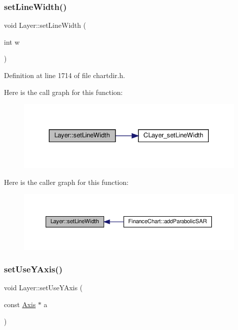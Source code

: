 \subsubsection{\texorpdfstring{set\+Line\+Width()}{setLineWidth()}}
{\footnotesize\ttfamily void Layer\+::set\+Line\+Width (\begin{DoxyParamCaption}\item[{int}]{w }\end{DoxyParamCaption})\hspace{0.3cm}{\ttfamily [inline]}}



Definition at line 1714 of file chartdir.\+h.

Here is the call graph for this function\+:
\nopagebreak
\begin{figure}[H]
\begin{center}
\leavevmode
\includegraphics[width=330pt]{class_layer_aab577b53410b150fc84dbb5dd502ff5f_cgraph}
\end{center}
\end{figure}
Here is the caller graph for this function\+:
\nopagebreak
\begin{figure}[H]
\begin{center}
\leavevmode
\includegraphics[width=350pt]{class_layer_aab577b53410b150fc84dbb5dd502ff5f_icgraph}
\end{center}
\end{figure}
\mbox{\label{class_layer_a5085490db860509f067b0fe68a55fe0a}} 
\subsubsection{\texorpdfstring{set\+Use\+Y\+Axis()}{setUseYAxis()}}
{\footnotesize\ttfamily void Layer\+::set\+Use\+Y\+Axis (\begin{DoxyParamCaption}\item[{const \hyperlink{class_axis}{Axis} $\ast$}]{a }\end{DoxyParamCaption})\hspace{0.3cm}{\ttfamily [inline]}}




